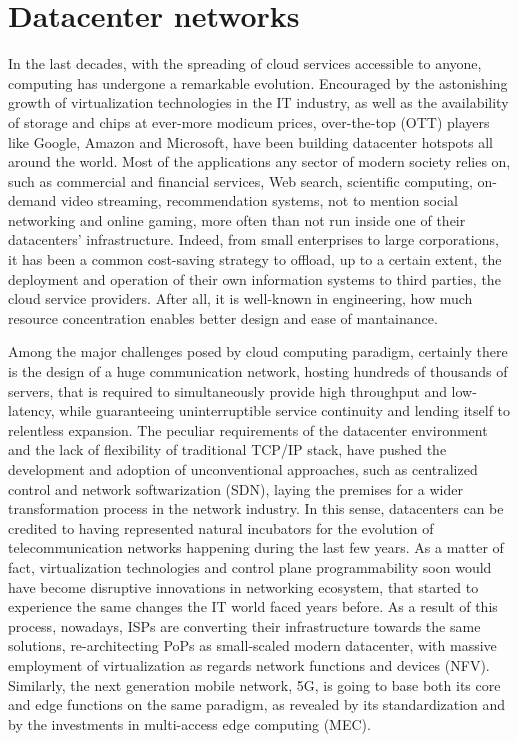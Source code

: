 \label{ch1}
\chapter{Datacenter networks}
In the last decades,  with the spreading of cloud services accessible to anyone, computing has undergone a remarkable evolution. Encouraged by the astonishing growth of virtualization technologies in the IT industry, as well as the availability of storage and chips at ever-more modicum prices, over-the-top (OTT) players like Google, Amazon and Microsoft, have been building datacenter hotspots all around the world. Most of the applications any sector of modern society relies on, such as commercial and financial services, Web search, scientific computing, on-demand video streaming, recommendation systems, not to mention social networking and online gaming, more often than not run inside one of their datacenters' infrastructure. Indeed, from small enterprises to large corporations, it has been a common cost-saving strategy to offload, up to a certain extent, the deployment and operation of their own information systems to third parties, the cloud service providers. 
After all, it is well-known in engineering, how much resource concentration enables better design and ease of mantainance.

Among the major challenges posed by cloud computing paradigm, certainly there is the design of a huge communication network, hosting hundreds of thousands of servers, that is required to simultaneously provide high throughput and low-latency, while guaranteeing uninterruptible service continuity and lending itself to relentless expansion.
 The peculiar requirements of the datacenter environment and the lack of flexibility of traditional TCP/IP stack, have pushed the development %
  and adoption of unconventional approaches, such as centralized control and network softwarization (SDN),  laying the premises for a wider transformation process in the network industry. 
In this sense, datacenters can be credited to having represented natural incubators for the evolution of telecommunication networks happening during the last few years. As a matter of fact, virtualization technologies and control plane programmability soon would have become disruptive innovations in networking ecosystem, that started to experience the same changes the IT world faced years before.
As a result of this process, nowadays, ISPs are converting their infrastructure towards the same solutions, re-architecting PoPs as small-scaled modern datacenter, with massive employment of virtualization as regards network functions and devices (NFV). Similarly, the next generation mobile network, 5G, is going to base both its core and edge functions on the same paradigm, as revealed by its standardization and by the investments in multi-access edge computing (MEC).


